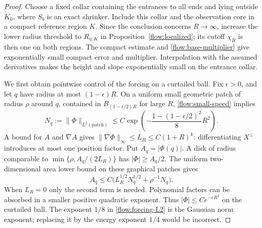 \begin{proof}
Choose a fixed collar containing the entrances to all ends and lying
outside $K_0$, where $S_b$ is an exact shrinker.  Include this collar
and the observation core in a compact reference region $K$.  Since
the conclusion concerns $R\to\infty$, increase the lower radius
threshold to $R_{\eta,K}$ in Proposition~\ref{flow:localized}; its
cutoff $\chi_R$ is then one on both regions.  The compact estimate
and \eqref{flow:base-multiplier} give exponentially small compact error
and multiplier.  Interpolation with the assumed derivatives makes the
height and slope exponentially small on the entrance collar.

We first obtain pointwise control of the forcing on a curtailed
ball.  Fix $\epsilon>0$, and let $q$ have radius at most
$(1-\epsilon)R$.  On a uniform small geometric patch of radius
$\rho$ around $q$, contained in $B_{(1-\epsilon/2)R}$ for large
$R$, \eqref{flow:small-speed} implies
\begin{equation}\label{flow:forcing-L2}
 N_q:=\|\Phi\|_{L^2(\text{patch})}
 \le C\exp\left(-\frac{1-(1-\epsilon/2)^2}{8}R^2\right).
\end{equation}
A bound for $A$ and $\nabla A$ gives
$\|\nabla\Phi\|_\infty\le L_R\le C(1+R)^k$: differentiating
$X^\perp$ introduces at most one position factor.  Put
$A_q=|\Phi(q)|$.  A disk of radius comparable to
$\min\{\rho,A_q/(2L_R)\}$ has $|\Phi|\ge A_q/2$.
The uniform two-dimensional area lower bound on these graphical
patches gives
\begin{equation}\label{flow:forcing-pointwise}
 A_q\le C\bigl(L_R^{1/2}N_q^{1/2}+\rho^{-1}N_q\bigr).
\end{equation}
When $L_R=0$ only the second term is needed.  Polynomial factors
can be absorbed in a smaller positive quadratic exponent.  Thus
$|\Phi|\le Ce^{-cR^2}$ on the curtailed ball.  The exponent
$1/8$ in \eqref{flow:forcing-L2} is the Gaussian norm exponent;
replacing it by the energy exponent $1/4$ would be incorrect.


\end{proof}
